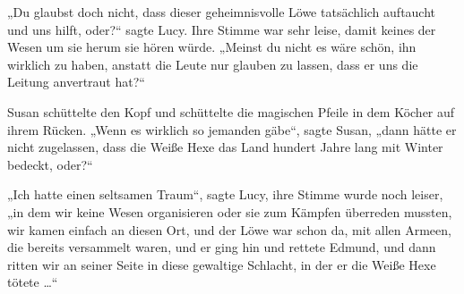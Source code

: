 „Du glaubst doch nicht, dass dieser geheimnisvolle Löwe tatsächlich auftaucht und uns hilft, oder?“ sagte Lucy. Ihre Stimme war sehr leise, damit keines der Wesen um sie herum sie hören würde.
„Meinst du nicht es wäre schön, ihn wirklich zu haben, anstatt die Leute nur glauben zu lassen, dass er uns die Leitung anvertraut hat?“

Susan schüttelte den Kopf und schüttelte die magischen Pfeile in dem Köcher auf ihrem Rücken.
„Wenn es wirklich so jemanden gäbe“, sagte Susan, „dann hätte er nicht zugelassen, dass die Weiße Hexe das Land hundert Jahre lang mit Winter bedeckt, oder?“

„Ich hatte einen seltsamen Traum“, sagte Lucy, ihre Stimme wurde noch leiser, „in dem wir keine Wesen organisieren oder sie zum Kämpfen überreden mussten, wir kamen einfach an diesen Ort, und der Löwe war schon da, mit allen Armeen, die bereits versammelt waren, und er ging hin und rettete Edmund, und dann ritten wir an seiner Seite in diese gewaltige Schlacht, in der er die Weiße Hexe tötete …“

